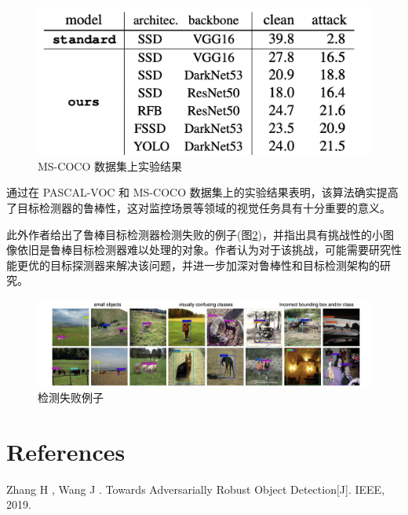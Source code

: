 \documentclass[conference,10pt]{IEEEtran}
\begin{document}
\begin{figure}[H]
	\centering
	\includegraphics[scale=0.3]{figure/fig7.png}
	\caption{MS-COCO 数据集上实验结果}
	\label{fig7}
\end{figure}

通过在 PASCAL-VOC 和 MS-COCO 数据集上的实验结果表明，该算法确实提高了目标检测器的鲁棒性，这对监控场景等领域的视觉任务具有十分重要的意义。

此外作者给出了鲁棒目标检测器检测失败的例子(图\ref{fig8})，并指出具有挑战性的小图像依旧是鲁棒目标检测器难以处理的对象。作者认为对于该挑战，可能需要研究性能更优的目标探测器来解决该问题，并进一步加深对鲁棒性和目标检测架构的研究。

\begin{figure}
	\centering
	\includegraphics[scale=0.4]{figure/fig8.png}
	\caption{检测失败例子}
	\label{fig8}
\end{figure}
\section*{References}
\begin{thebibliography}{00}
 Zhang H ,  Wang J . Towards Adversarially Robust Object Detection[J]. IEEE, 2019.
\end{thebibliography}
\end{document}
